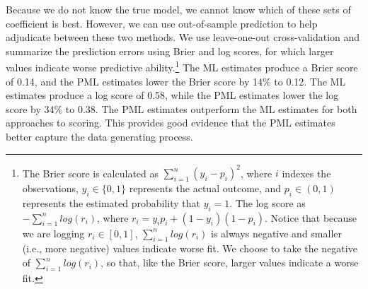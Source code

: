 \documentclass[12pt]{article}
\begin{document}



Because we do not know the true model, we cannot know which of these sets of coefficient is best. 
However, we can use out-of-sample prediction to help adjudicate between these two methods. 
We use leave-one-out cross-validation and summarize the prediction errors using Brier and log scores, for which larger values indicate worse predictive ability.\footnote{The Brier score is calculated as $\sum_{i = 1}^n (y_i - p_i)^2$, where $i$ indexes the observations, $y_i \in \{0, 1\}$ represents the actual outcome, and $p_i \in (0, 1)$ represents the estimated probability that $y_i = 1$. 
The log score as $-\sum_{i = 1}^n log(r_i)$, where $r_i = y_i p_i + (1 - y_i)(1 - p_i)$. 
Notice that because we are logging $r_i \in [0, 1]$, $\sum_{i = 1}^n log(r_i)$ is always negative and smaller (i.e., more negative) values indicate worse fit. 
We choose to take the negative of $\sum_{i = 1}^n log(r_i)$, so that, like the Brier score, larger values indicate a worse fit.} 
The ML estimates produce a Brier score of 0.14, and the PML estimates lower the Brier score by 14\% to 0.12. 
The ML estimates produce a log score of 0.58, while the PML estimates lower the log score by 34\% to 0.38. 
The PML estimates outperform the ML estimates for both approaches to scoring.
This provides good evidence that the PML estimates better capture the data generating process.
 
\end{document}
